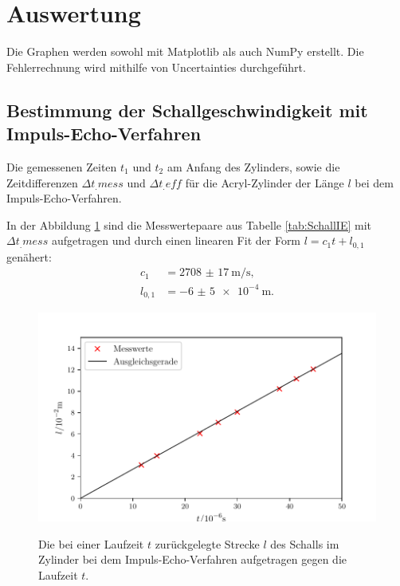 \section{Auswertung}
\label{sec:Auswertung}


Die Graphen werden sowohl mit Matplotlib \cite{matplotlib} als auch NumPy \cite{numpy} erstellt. Die Fehlerrechnung wird mithilfe von Uncertainties \cite{uncertainties} durchgeführt.

\subsection{Bestimmung der Schallgeschwindigkeit mit Impuls-Echo-Verfahren}

\begin{table}
	\centering
	\caption{Die gemessenen Zeiten $t_1$ und $t_2$ am Anfang des Zylinders, sowie die Zeitdifferenzen $\Delta t_.{mess}$ und $\Delta t_.{eff}$ für die Acryl-Zylinder der Länge $l$ bei dem Impuls-Echo-Verfahren.}
	
	\label{tab:SchallIE}
\end{table}

\noindent In der Abbildung \ref{fig:SchallIE} sind die Messwertepaare aus Tabelle \ref{tab:SchallIE} mit $\Delta t_.{mess}$ aufgetragen und durch einen linearen Fit der Form $l=c_1 t + l_{0,1}$ genähert:
\begin{align*}
	c_1&=\SI{2708(17)}{\meter\per\second}\text{,}\\
	l_{0,1}&=\SI{-6(5)e-4}{\meter}\text{.}
\end{align*}

\begin{figure}
	\centering
	\caption{Die bei einer Laufzeit $t$ zurückgelegte Strecke $l$ des Schalls im Zylinder bei dem Impuls-Echo-Verfahren aufgetragen gegen die Laufzeit $t$.}
	\includegraphics[width=\linewidth-70pt,height=\textheight-70pt,keepaspectratio]{content/images/Schallgeschwindigkeit.pdf}
	\label{fig:SchallIE}
\end{figure}

